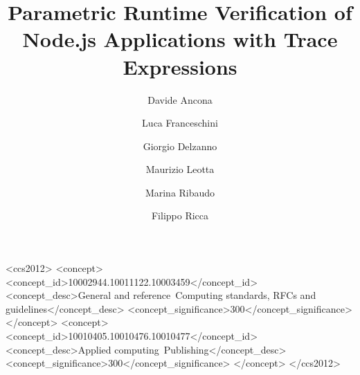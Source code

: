 \documentclass[english,submission]{programming}
\begin{document}
\title{Parametric Runtime Verification of Node.js Applications with Trace Expressions}
\subtitle{}%

\author{Davide Ancona}
\author{Luca Franceschini}
\author{Giorgio Delzanno}
\author{Maurizio Leotta}
\author{Marina Ribaudo}
\author{Filippo Ricca}






\begin{CCSXML}
<ccs2012>
<concept>
<concept_id>10002944.10011122.10003459</concept_id>
<concept_desc>General and reference~Computing standards, RFCs and guidelines</concept_desc>
<concept_significance>300</concept_significance>
</concept>
<concept>
<concept_id>10010405.10010476.10010477</concept_id>
<concept_desc>Applied computing~Publishing</concept_desc>
<concept_significance>300</concept_significance>
</concept>
</ccs2012>
\end{CCSXML}
\end{document}

